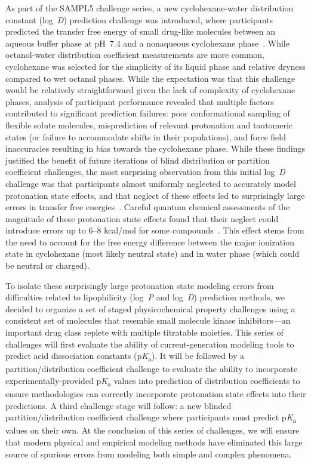 \documentclass[9pt,lineno]{elife}
\newcommand{\pKa}{p\textit{K}\textsubscript{a}}
\newcommand{\logD}{log~\textit{D}}
\newcommand{\logP}{log~\textit{P}}
\begin{document}
As part of the SAMPL5 challenge series, a new cyclohexane-water distribution constant (\logD{}) prediction challenge was introduced, where participants predicted the transfer free energy of small drug-like molecules between an aqueous buffer phase at pH~7.4 and a nonaqueous cyclohexane phase~\citep{bannan_blind_2016,rustenburg_measuring_2016}. 
While octanol-water distribution coefficient measurements are more common, cyclohexane was selected for the simplicity of its liquid phase and relative dryness compared to wet octanol phases.
While the expectation was that this challenge would be relatively straightforward given the lack of complexity of cyclohexane phases, analysis of participant performance revealed that multiple factors contributed to significant prediction failures: poor conformational sampling of flexible solute molecules, misprediction of relevant protonation and tautomeric states (or failure to accommodate shifts in their populations), and force field inaccuracies resulting in bias towards the cyclohexane phase.
While these findings justified the benefit of future iterations of blind distribution or partition coefficient challenges, the most surprising observation from this initial \logD{} challenge was that participants almost uniformly neglected to accurately model protonation state effects, and that neglect of these effects led to surprisingly large errors in transfer free energies~\citep{bannan_blind_2016, pickard_blind_2016,rustenburg_measuring_2016}. 
Careful quantum chemical assessments of the magnitude of these protonation state effects found that their neglect could introduce errors up to 6--8 kcal/mol for some compounds~\citep{pickard_blind_2016}. 
This effect stems from the need to account for the free energy difference between the major ionization state in cyclohexane (most likely neutral state) and in water phase (which could be neutral or charged). 

To isolate these surprisingly large protonation state modeling errors from difficulties related to lipophilicity (\logP{} and \logD{}) prediction methods, we decided to organize a set of staged physicochemical property challenges using a consistent set of molecules that resemble small molecule kinase inhibitors---an important drug class replete with multiple titratable moieties.
This series of challenges will first evaluate the ability of current-generation modeling tools to predict acid dissociation constants (\pKa). 
It will be followed by a partition/distribution coefficient challenge to evaluate the ability to incorporate experimentally-provided \pKa{} values into prediction of distribution coefficients to ensure methodologies can correctly incorporate protonation state effects into their predictions. 
A third challenge stage will follow: a new blinded partition/distribution coefficient challenge where participants must predict \pKa{} values on their own.
At the conclusion of this series of challenges, we will ensure that modern physical and empirical modeling methods have eliminated this large source of spurious errors from modeling both simple and complex phenomena.
\end{document}
